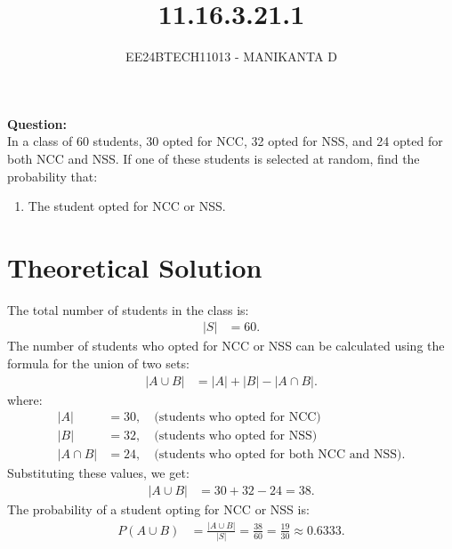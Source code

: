 \documentclass[journal]{IEEEtran}
\begin{document}

\vspace{3cm}

\title{11.16.3.21.1}
\author{EE24BTECH11013 - MANIKANTA D}
{\let\newpage\relax\maketitle}

\renewcommand{\thefigure}{\theenumi}
\renewcommand{\thetable}{\theenumi}
\setlength{\intextsep}{10pt} %

\renewcommand{\thetable}{\theenumi}

\textbf{Question:}\\
In a class of 60 students, 30 opted for NCC, 32 opted for NSS, and 24 opted for both NCC and NSS. If one of these students is selected at random, find the probability that:
\begin{enumerate}
    \item The student opted for NCC or NSS.
\end{enumerate}

\section{Theoretical Solution}
The total number of students in the class is:
\begin{align}
    |S| &= 60.
\end{align}
The number of students who opted for NCC or NSS can be calculated using the formula for the union of two sets:
\begin{align}
    |A \cup B| &= |A| + |B| - |A \cap B|.
\end{align}
where:
\begin{align}
    |A| &= 30, \quad \text{(students who opted for NCC)} \\
    |B| &= 32, \quad \text{(students who opted for NSS)} \\
    |A \cap B| &= 24, \quad \text{(students who opted for both NCC and NSS)}.
\end{align}
Substituting these values, we get:
\begin{align}
    |A \cup B| &= 30 + 32 - 24 = 38.
\end{align}
The probability of a student opting for NCC or NSS is:
\begin{align}
    P(A \cup B) &= \frac{|A \cup B|}{|S|} = \frac{38}{60} = \frac{19}{30} \approx 0.6333.
\end{align}
\end{document}
